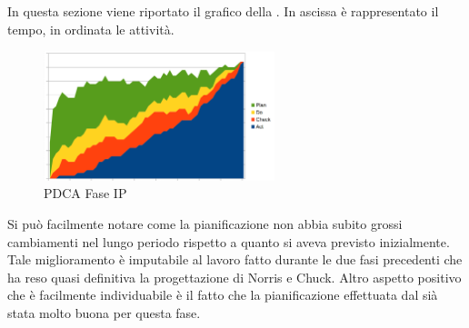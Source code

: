 	In questa sezione viene riportato il grafico  della . In ascissa è rappresentato il tempo, in ordinata le attività.
	\begin{figure}[H]
		\centering
		\includegraphics[width=0.6\textwidth]{PianoDiQualifica/Pics/GraficoPDCAFaseIP.png}
		\caption{PDCA Fase IP}
	\end{figure}

	Si può facilmente notare come la pianificazione non abbia subito grossi cambiamenti nel lungo periodo rispetto a quanto si aveva previsto inizialmente. Tale miglioramento è imputabile al lavoro fatto durante le due fasi precedenti che ha reso quasi definitiva la progettazione di Norris e Chuck. Altro aspetto positivo che è facilmente individuabile è il fatto che la pianificazione effettuata dal  sià stata molto buona per questa fase.